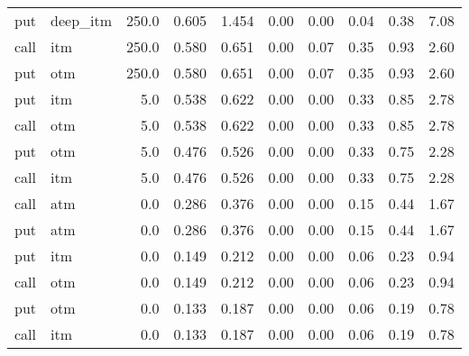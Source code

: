 \begin{longtable}{llrrrrrrrr}
  put &  deep\_itm &     250.0 & 0.605 & 1.454 &    0.00 &    0.00 &   0.04 &    0.38 &    7.08 \\
 call &       itm &     250.0 & 0.580 & 0.651 &    0.00 &    0.07 &   0.35 &    0.93 &    2.60 \\
  put &       otm &     250.0 & 0.580 & 0.651 &    0.00 &    0.07 &   0.35 &    0.93 &    2.60 \\
  put &       itm &       5.0 & 0.538 & 0.622 &    0.00 &    0.00 &   0.33 &    0.85 &    2.78 \\
 call &       otm &       5.0 & 0.538 & 0.622 &    0.00 &    0.00 &   0.33 &    0.85 &    2.78 \\
  put &       otm &       5.0 & 0.476 & 0.526 &    0.00 &    0.00 &   0.33 &    0.75 &    2.28 \\
 call &       itm &       5.0 & 0.476 & 0.526 &    0.00 &    0.00 &   0.33 &    0.75 &    2.28 \\
 call &       atm &       0.0 & 0.286 & 0.376 &    0.00 &    0.00 &   0.15 &    0.44 &    1.67 \\
  put &       atm &       0.0 & 0.286 & 0.376 &    0.00 &    0.00 &   0.15 &    0.44 &    1.67 \\
  put &       itm &       0.0 & 0.149 & 0.212 &    0.00 &    0.00 &   0.06 &    0.23 &    0.94 \\
 call &       otm &       0.0 & 0.149 & 0.212 &    0.00 &    0.00 &   0.06 &    0.23 &    0.94 \\
  put &       otm &       0.0 & 0.133 & 0.187 &    0.00 &    0.00 &   0.06 &    0.19 &    0.78 \\
 call &       itm &       0.0 & 0.133 & 0.187 &    0.00 &    0.00 &   0.06 &    0.19 &    0.78 \\
\end{longtable}
